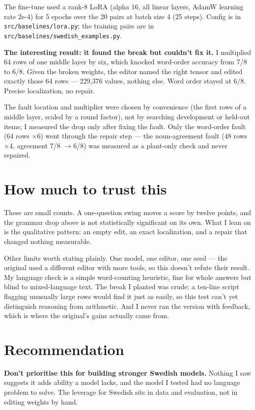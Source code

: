 \documentclass[11pt]{article}
\begin{document}
The fine-tune used a rank-8 LoRA (alpha 16, all linear layers, AdamW learning rate 2e-4) for
5 epochs over the 20 pairs at batch size 4 (25 steps). Config is in
\texttt{src/baselines/lora.py}; the training pairs are in
\texttt{src/baselines/swedish\_examples.py}.

\textbf{The interesting result: it found the break but couldn't fix it.} I multiplied 64
rows of one middle layer by six, which knocked word-order accuracy from 7/8 to 6/8. Given
the broken weights, the editor named the right tensor and edited exactly those 64 rows ---
229{,}376 values, nothing else. Word order stayed at 6/8. Precise localization, no repair.

The fault location and multiplier were chosen by convenience (the first rows of a middle
layer, scaled by a round factor), not by searching development or held-out items; I measured
the drop only after fixing the fault. Only the word-order fault (64 rows $\times$6) went
through the repair step --- the noun-agreement fault (48 rows $\times$4, agreement 7/8
$\rightarrow$6/8) was measured as a plant-only check and never repaired.

\section{How much to trust this}

These are small counts. A one-question swing moves a score by twelve points, and the grammar
drop above is not statistically significant on its own. What I lean on is the qualitative
pattern: an empty edit, an exact localization, and a repair that changed nothing measurable.

Other limits worth stating plainly. One model, one editor, one seed --- the original used a
different editor with more tools, so this doesn't refute their result. My language check is
a simple word-counting heuristic, fine for whole answers but blind to mixed-language text.
The break I planted was crude: a ten-line script flagging unusually large rows would find it
just as easily, so this test can't yet distinguish reasoning from arithmetic. And I never ran
the version with feedback, which is where the original's gains actually came from.

\section{Recommendation}

\textbf{Don't prioritise this for building stronger Swedish models.} Nothing I saw suggests
it adds ability a model lacks, and the model I tested had no language problem to solve. The
leverage for Swedish sits in data and evaluation, not in editing weights by hand.
\end{document}
